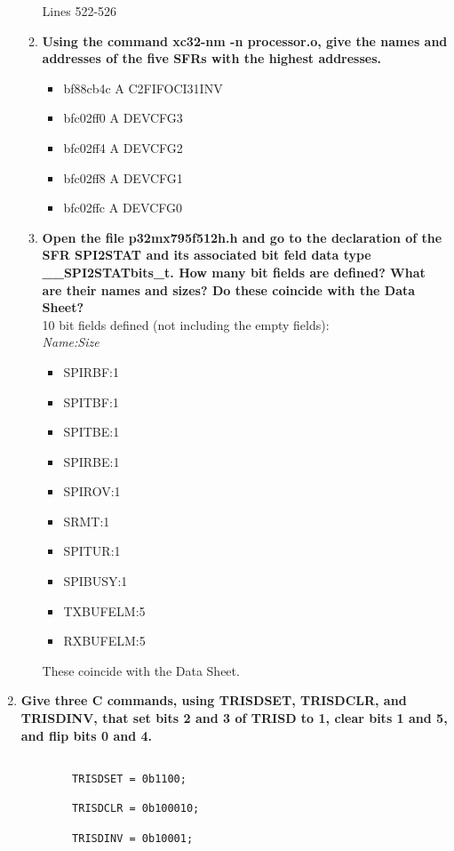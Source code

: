 \documentclass{article}
\begin{document}
\begin{enumerate}[label=\textbf{\arabic*})]
\begin{enumerate}[label=\textbf{\alph*}.]
        Lines 522-526

        \item \textbf{Using the command xc32-nm -n processor.o, give the names and addresses of the
        five SFRs with the highest addresses.}
        \begin{itemize}
            \item bf88cb4c A C2FIFOCI31INV
            \item bfc02ff0 A DEVCFG3
            \item bfc02ff4 A DEVCFG2
            \item bfc02ff8 A DEVCFG1
            \item bfc02ffc A DEVCFG0
        \end{itemize}

        \pagebreak
        \item \textbf{Open the file p32mx795f512h.h and go to the declaration of the SFR SPI2STAT and its
        associated bit feld data type \_\_SPI2STATbits\_t. How many bit fields are defined?
        What are their names and sizes? Do these coincide with the Data Sheet?} \\

        10 bit fields defined (not including the empty fields): \\

        \textit{Name:Size}
        \begin{itemize}
            \item SPIRBF:1
            \item SPITBF:1
            \item SPITBE:1
            \item SPIRBE:1
            \item SPIROV:1
            \item SRMT:1
            \item SPITUR:1
            \item SPIBUSY:1
            \item TXBUFELM:5
            \item RXBUFELM:5
        \end{itemize}

        These coincide with the Data Sheet.
    \end{enumerate}

    \item \textbf{Give three C commands, using TRISDSET, TRISDCLR, and TRISDINV, that set bits 2
    and 3 of TRISD to 1, clear bits 1 and 5, and flip bits 0 and 4.}

    \begin{lstlisting}

        TRISDSET = 0b1100;

        TRISDCLR = 0b100010;

        TRISDINV = 0b10001;

    \end{lstlisting}

\end{enumerate}
\end{document}
